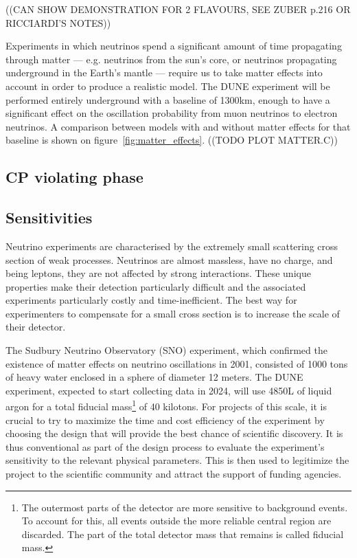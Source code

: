 \documentclass[10pt, a4paper]{article}
\begin{document}
((CAN SHOW DEMONSTRATION FOR 2 FLAVOURS, SEE ZUBER p.216 OR RICCIARDI'S
NOTES))


Experiments in which neutrinos spend a significant amount of time propagating through
matter --- e.g. neutrinos from the sun's core, or neutrinos propagating underground in the
Earth's mantle --- require us to take matter effects into account in order to produce a
realistic model. The DUNE experiment will be performed entirely underground
with a baseline of 1300km, enough to have a significant effect on the
oscillation probability from muon neutrinos to electron neutrinos. A comparison
between models with and without matter effects for that baseline is shown on
figure~\ref{fig:matter_effects}.
((TODO PLOT MATTER.C))

\subsection{CP violating phase}

\subsection{Sensitivities}
Neutrino experiments are characterised by the extremely small scattering cross
section of weak processes. Neutrinos are almost massless, have no charge, and
being leptons, they are not affected by strong interactions. These unique
properties make their detection particularly difficult and the associated
experiments particularly costly and time-inefficient. The best way for
experimenters to compensate for a small cross section is to increase the scale
of their detector. 

The Sudbury Neutrino Observatory (SNO) experiment, which confirmed
the existence of matter effects on neutrino oscillations in 2001, consisted of 1000
tons of heavy water enclosed in a sphere of diameter 12 meters\cite{thomson}.
The DUNE experiment, expected to start collecting data in 2024, will use 4850L
of liquid argon for a total fiducial mass\footnote{The outermost parts of the
detector are more sensitive to background events. To account for this, all
events outside the more reliable central region are discarded. The part of the
total detector mass that remains is called fiducial mass.} of 40 kilotons\cite{cdr}.
For projects of this scale, it is crucial to try to maximize the time and cost
efficiency of the experiment by choosing the design that will provide the best
chance of scientific discovery. It is thus conventional as part of the design
process to evaluate the experiment's sensitivity to the relevant physical
parameters. This is then used to legitimize the project to the scientific
community and attract the support of funding agencies.
\end{document}
